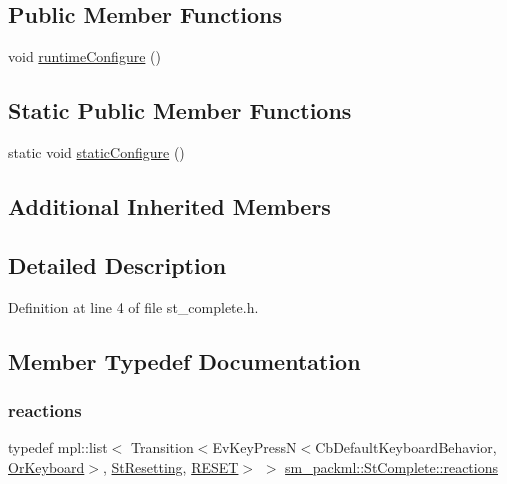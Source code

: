 \subsection*{Public Member Functions}
\begin{DoxyCompactItemize}
\item 
void \hyperlink{structsm__packml_1_1StComplete_af6884149d83d202713c31c0aa85fa9e2}{runtime\+Configure} ()
\end{DoxyCompactItemize}
\subsection*{Static Public Member Functions}
\begin{DoxyCompactItemize}
\item 
static void \hyperlink{structsm__packml_1_1StComplete_a6d671966b0f05fc72d1662054a32ecd3}{static\+Configure} ()
\end{DoxyCompactItemize}
\subsection*{Additional Inherited Members}


\subsection{Detailed Description}


Definition at line 4 of file st\+\_\+complete.\+h.



\subsection{Member Typedef Documentation}
\mbox{\label{structsm__packml_1_1StComplete_abe26a003ec05b72f290f6b5c2497123e}} 
\subsubsection{\texorpdfstring{reactions}{reactions}}
{\footnotesize\ttfamily typedef mpl\+::list$<$ Transition$<$Ev\+Key\+PressN$<$Cb\+Default\+Keyboard\+Behavior, \hyperlink{classsm__packml_1_1OrKeyboard}{Or\+Keyboard}$>$, \hyperlink{structsm__packml_1_1StResetting}{St\+Resetting}, \hyperlink{structsm__packml_1_1StComplete_1_1RESET}{R\+E\+S\+ET}$>$ $>$ \hyperlink{structsm__packml_1_1StComplete_abe26a003ec05b72f290f6b5c2497123e}{sm\+\_\+packml\+::\+St\+Complete\+::reactions}}




